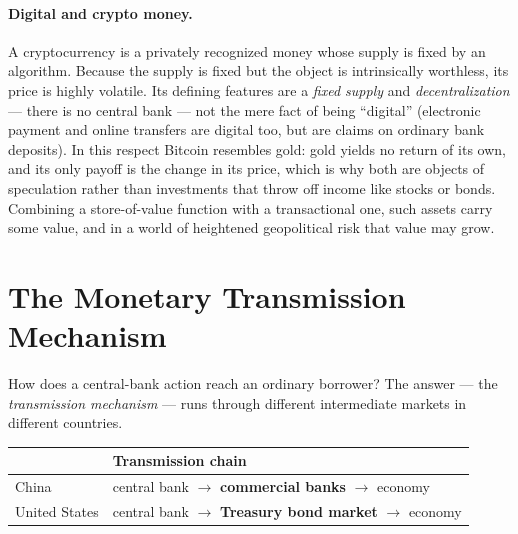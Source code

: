 
\paragraph{Digital and crypto money.} A cryptocurrency is a privately recognized money whose supply is fixed by an algorithm. Because the supply is fixed but the object is intrinsically worthless, its price is highly volatile. Its defining features are a \emph{fixed supply} and \emph{decentralization} --- there is no central bank --- not the mere fact of being ``digital'' (electronic payment and online transfers are digital too, but are claims on ordinary bank deposits). In this respect Bitcoin resembles gold: gold yields no return of its own, and its only payoff is the change in its price, which is why both are objects of speculation rather than investments that throw off income like stocks or bonds. Combining a store-of-value function with a transactional one, such assets carry some value, and in a world of heightened geopolitical risk that value may grow.

\section{The Monetary Transmission Mechanism}

How does a central-bank action reach an ordinary borrower? The answer --- the \emph{transmission mechanism} --- runs through different intermediate markets in different countries.

\begin{center}
\renewcommand{\arraystretch}{1.4}
\begin{tabular}{@{}ll@{}}
\toprule
& Transmission chain \\
\midrule
China & central bank $\to$ \textbf{commercial banks} $\to$ economy \\
United States & central bank $\to$ \textbf{Treasury bond market} $\to$ economy \\
\bottomrule
\end{tabular}
\end{center}

